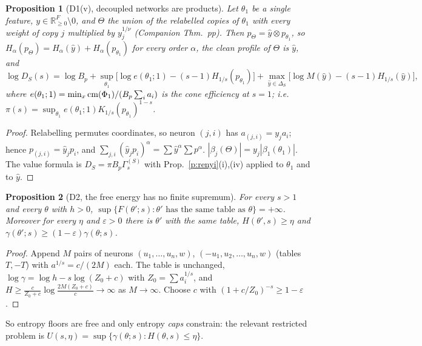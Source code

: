 \documentclass[11pt]{article}
\newtheorem{proposition}{Proposition}[section]\newtheorem{lemma}[proposition]{Lemma}\newtheorem{corollary}[proposition]{Corollary}
\theoremstyle{remark}\newtheorem{remark}[proposition]{Remark}
\begin{document}
\begin{proposition}[D1(v), decoupled networks are products]\label{p:prod}
Let $\theta_1$ be a single feature, $y\in\mathbb R^F_{\ge0}\setminus0$, and $\Theta$ the union of the relabelled copies of $\theta_1$ with every
weight of copy $j$ multiplied by $y_j^{1/\nu}$ (Companion Thm.~pp). Then $p_\Theta=\hat y\otimes p_{\theta_1}$, so
$H_\alpha(p_\Theta)=H_\alpha(\hat y)+H_\alpha(p_{\theta_1})$ for every order $\alpha$, the clean profile of $\Theta$ is $\hat y$, and
\[\log D_S(s)=\log B_p+\sup_{\theta_1}\big[\log e(\theta_1;1)-(s-1)H_{1/s}(p_{\theta_1})\big]+\max_{\hat y\in\Delta_S}\big[\log M(\hat y)-(s-1)H_{1/s}(\hat y)\big],\]
where $e(\theta_1;1)=\min_x\mathrm{cm}(\Phi_1)/(B_p\sum_ia_i)$ is the cone efficiency at $s=1$; i.e.\ $\pi(s)=\sup_{\theta_1}e(\theta_1;1)K_{1/s}(p_{\theta_1})^{1-s}$.
\end{proposition}
\begin{proof}
Relabelling permutes coordinates, so neuron $(j,i)$ has $a_{(j,i)}=y_ja_i$; hence $p_{(j,i)}=\hat y_jp_i$, and
$\sum_{j,i}(\hat y_jp_i)^\alpha=\sum\hat y^\alpha\sum p^\alpha$. $|\beta_j(\Theta)|=y_j|\beta_1(\theta_1)|$. The value formula is
$D_S=\pi B_p\Gamma^{(S)}_s$ with Prop.~\ref{p:renyi}(i),(iv) applied to $\theta_1$ and to $\hat y$.
\end{proof}

\begin{proposition}[D2, the free energy has no finite supremum]\label{p:dust}
For every $s>1$ and every $\theta$ with $h>0$, $\sup\{F(\theta';s):\theta'\text{ has the same table as }\theta\}=+\infty$. Moreover for every
$\eta$ and $\varepsilon>0$ there is $\theta'$ with the same table, $H(\theta',s)\ge\eta$ and $\gamma(\theta';s)\ge(1-\varepsilon)\gamma(\theta;s)$.
\end{proposition}
\begin{proof}
Append $M$ pairs of neurons $(u_1,\dots,u_n,w)$, $(-u_1,u_2,\dots,u_n,w)$ (tables $T,-T$) with $a^{1/s}=c/(2M)$ each. The table is unchanged,
$\log\gamma=\log h-s\log(Z_0+c)$ with $Z_0=\sum a_i^{1/s}$, and $H\ge\frac{c}{Z_0+c}\log\frac{2M(Z_0+c)}{c}\to\infty$ as $M\to\infty$.
Choose $c$ with $(1+c/Z_0)^{-s}\ge1-\varepsilon$.
\end{proof}
So entropy floors are free and only entropy \emph{caps} constrain: the relevant restricted problem is $U(s,\eta)=\sup\{\gamma(\theta;s):H(\theta,s)\le\eta\}$.
\end{document}
